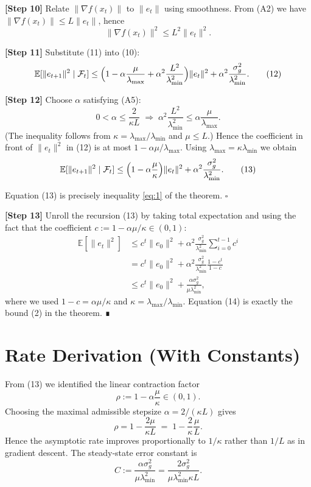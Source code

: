 \documentclass[11pt]{article}
\newcommand{\E}{\mathbb{E}}
\begin{document}
\medskip
\noindent\textbf{[Step 10]}  Relate $\|\nabla f(x_{t})\|$ to $\|e_{t}\|$ using smoothness.
From (A2) we have $\|\nabla f(x_{t})\|\le L\|e_{t}\|$, hence
\[
\|\nabla f(x_{t})\|^{2}\le L^{2}\|e_{t}\|^{2}.
\tag{11}
\]

\medskip
\noindent\textbf{[Step 11]}  Substitute (11) into (10):
\[
\E[\|e_{t+1}\|^{2}\mid\mathcal{F}_{t}]
\le\Bigl(1-\alpha\frac{\mu}{\lambda_{\max}}+\alpha^{2}\frac{L^{2}}{\lambda_{\min}^{2}}\Bigr)
\|e_{t}\|^{2}
+\alpha^{2}\frac{\sigma_{g}^{2}}{\lambda_{\min}^{2}} .
\tag{12}
\]

\medskip
\noindent\textbf{[Step 12]}  Choose $\alpha$ satisfying (A5):
\[
0<\alpha\le\frac{2}{\kappa L}
\;\Longrightarrow\;
\alpha^{2}\frac{L^{2}}{\lambda_{\min}^{2}}\le
\alpha\frac{\mu}{\lambda_{\max}} .
\]
(The inequality follows from $\kappa=\lambda_{\max}/\lambda_{\min}$ and
$\mu\le L$.)  Hence the coefficient in front of $\|e_{t}\|^{2}$ in (12) is at most
$1-\alpha\mu/\lambda_{\max}$.  Using $\lambda_{\max}=\kappa\lambda_{\min}$ we obtain
\[
\E[\|e_{t+1}\|^{2}\mid\mathcal{F}_{t}]
\le\Bigl(1-\alpha\frac{\mu}{\kappa}\Bigr)\|e_{t}\|^{2}
+\alpha^{2}\frac{\sigma_{g}^{2}}{\lambda_{\min}^{2}} .
\tag{13}
\]

Equation (13) is precisely inequality \eqref{eq:1} of the theorem.
\hfill $\square$

\medskip
\noindent\textbf{[Step 13]}  Unroll the recursion (13) by taking total expectation
and using the fact that the coefficient $c:=1-\alpha\mu/\kappa\in(0,1)$:
\[
\begin{aligned}
\E[\|e_{t}\|^{2}]
&\le c^{t}\|e_{0}\|^{2}
+\alpha^{2}\frac{\sigma_{g}^{2}}{\lambda_{\min}^{2}}
\sum_{i=0}^{t-1}c^{i}\\
&= c^{t}\|e_{0}\|^{2}
+\alpha^{2}\frac{\sigma_{g}^{2}}{\lambda_{\min}^{2}}
\frac{1-c^{t}}{1-c}\\
&\le c^{t}\|e_{0}\|^{2}
+\frac{\alpha\sigma_{g}^{2}}{\mu\lambda_{\min}^{2}},
\end{aligned}
\tag{14}
\]
where we used $1-c=\alpha\mu/\kappa$ and $\kappa=\lambda_{\max}/\lambda_{\min}$.
Equation (14) is exactly the bound (2) in the theorem.  ∎

\section*{Rate Derivation (With Constants)}
From (13) we identified the linear contraction factor
\[
\rho:=1-\alpha\frac{\mu}{\kappa}\in(0,1).
\]
Choosing the maximal admissible stepsize $\alpha=2/(\kappa L)$ gives
\[
\rho=1-\frac{2\mu}{\kappa L}\;=\;1-\frac{2}{\kappa}\frac{\mu}{L}.
\]
Hence the asymptotic rate improves proportionally to $1/\kappa$ rather than
$1/L$ as in gradient descent.  The steady‑state error constant is
\[
C:=\frac{\alpha\sigma_{g}^{2}}{\mu\lambda_{\min}^{2}}
= \frac{2\sigma_{g}^{2}}{\mu\lambda_{\min}^{2}\kappa L}.
\]
\end{document}
